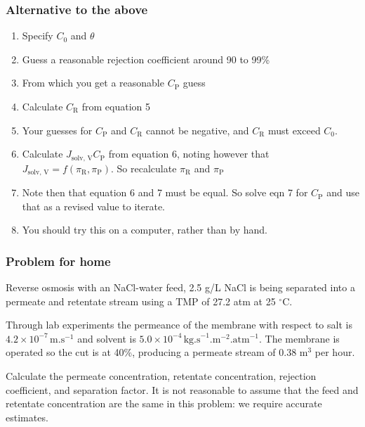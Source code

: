 \begin{frame}\frametitle{Alternative to the above}
	\begin{enumerate}
		\item	Specify $C_\text{0}$ and $\theta$
		\item	Guess a reasonable rejection coefficient around 90 to 99\%
		\item	From which you get a reasonable $C_\text{P}$ guess
		\item	Calculate $C_\text{R}$ from equation 5
		\item	Your guesses for $C_\text{P}$ and $C_\text{R}$ cannot be negative, and $C_\text{R}$ must exceed $C_\text{0}$.
		\item	Calculate $J_\text{solv, V} C_\text{P}$ from equation 6, noting however that $J_\text{solv, V} = f(\pi_\text{R}, \pi_\text{P})$. So recalculate $\pi_\text{R}$ and $\pi_\text{P}$
		\item	Note then that equation 6 and 7 must be equal. So solve eqn 7 for $C_\text{P}$ and use that as a revised value to iterate.
		\item	You should try this on a computer, rather than by hand.
	\end{enumerate}
\end{frame}

\begin{frame}\frametitle{Problem for home}
	
	Reverse osmosis with an NaCl-water feed, 2.5 g/L NaCl is being separated into a permeate and retentate stream using a TMP of 27.2 atm at 25 $^\circ$C.
	
	\vspace{12pt}
	Through lab experiments the permeance of the membrane with respect to salt is $4.2 \times 10^{-7}\,\text{m.s}^{-1}$ and solvent is $5.0 \times 10^{-4}\,\text{kg.s}^{-1}\text{.m}^{-2}\text{.atm}^{-1}$. The membrane is operated so the cut is at 40\%, producing a permeate stream of 0.38 $\text{m}^3$ per hour.
	
	\vspace{12pt}
	Calculate the permeate concentration, retentate concentration, rejection coefficient, and separation factor. It is not reasonable to assume that the feed and retentate concentration are the same in this problem: we require accurate estimates.
	
\end{frame}


